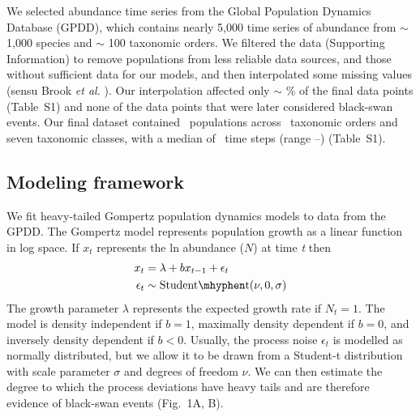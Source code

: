 We selected abundance time series from the Global Population Dynamics
Database \citep{gpdd2010} (GPDD), which contains nearly 5,000 time series of
abundance from \(\sim\) 1,000 species and \(\sim\) 100 taxonomic orders. We
filtered the data (Supporting Information) to remove populations from less
reliable data sources, and those without sufficient data for our models, and
then interpolated some missing values (sensu Brook \textit{et
al.} \citep{brook2006a}). Our interpolation affected only \(\sim\)
\interpPointsPerc \% of the final data points (Table~S1) and none of the data
points that were later considered black-swan events. Our final dataset
contained \NPops\ populations across \NOrders\ taxonomic orders and seven
taxonomic classes, with a median of \medianTimeSteps\ time steps (range
\minTimeSteps--\maxTimeSteps) (Table~S1).

\subsection{Modeling framework}

We fit heavy-tailed Gompertz population dynamics models to data from the GPDD. The Gompertz model represents population growth as a linear function in log space. If \(x_{t}\) represents the ln abundance (\(N\)) at time \emph{t} then
\begin{align}
x_t &= \lambda + bx_{t - 1} + \epsilon_t\\
\epsilon_t &\sim \mathrm{Student\mhyphen t}(\nu, 0, \sigma)
\end{align}
The growth parameter \(\lambda\) represents the expected growth rate if \(N_{t}
= 1\). The model is density independent if \(b = 1\), maximally density
dependent if \(b = 0\), and inversely density dependent if \(b < 0\). Usually,
the process noise \(\epsilon_{t}\) is modelled as normally distributed, but we
allow it to be drawn from a Student-t distribution with scale parameter
\(\sigma\) and degrees of freedom \(\nu\). We can then estimate the degree to
which the process deviations have heavy tails and are therefore evidence of
black-swan events (Fig.~1A, B).

